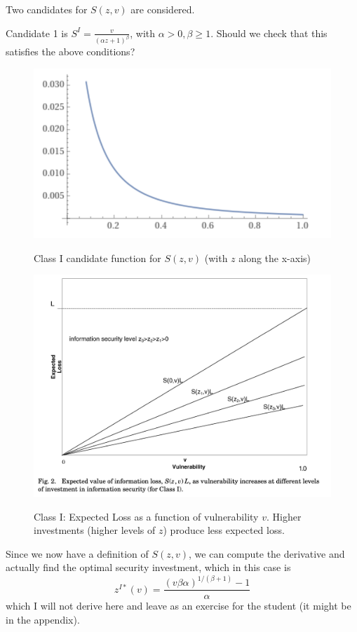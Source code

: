 \documentclass[11pt]{article}
\begin{document}
Two candidates for $S(z,v)$ are considered.

Candidate 1 is $S^I = \frac{v}{(\alpha z + 1)^\beta}$, with $\alpha > 0, \beta \geq 1$. Should we check that this satisfies the above conditions?

\begin{figure}[h]
    \centering
    \includegraphics*[width=4.5in]{class1.png}
    \label{fig:class1}
    \caption{Class I candidate function for $S(z,v)$ (with $z$ along the x-axis)}
\end{figure}
\FloatBarrier

\begin{figure}[h]
    \centering
    \includegraphics*[width=4.5in]{fig2.png}
    \label{fig:class1}
    \caption{Class I: Expected Loss as a function of vulnerability $v$. Higher investments (higher levels of $z$) produce less expected loss.}
\end{figure}
\FloatBarrier

Since we now have a definition of $S(z,v)$, we can compute the derivative and actually find the optimal security investment, which in this case is 
$$z^{I*}(v) = \frac{(v \beta \alpha )^{1/(\beta + 1)} - 1}{\alpha}$$ 
which I will not derive here and leave as an exercise for the student (it might be in the appendix).
\end{document}
